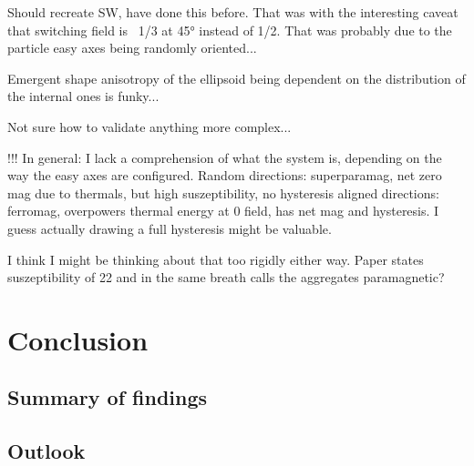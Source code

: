 \documentclass[12pt, DIV=12]{scrartcl}
\begin{document}
Should recreate SW, have done this before. That was with the interesting caveat that switching field is ~1/3 at 45° instead of 1/2. That was probably due to the particle easy axes being randomly oriented...

Emergent shape anisotropy of the ellipsoid being dependent on the distribution of the internal ones is funky...

Not sure how to validate anything more complex...

!!! In general: I lack a comprehension of what the system is, depending on the way the easy axes are configured.
Random directions: superparamag, net zero mag due to thermals, but high suszeptibility, no hysteresis
aligned directions: ferromag, overpowers thermal energy at 0 field, has net mag and hysteresis.
I guess actually drawing a full hysteresis might be valuable.

I think I might be thinking about that too rigidly either way.
Paper states suszeptibility of 22 and in the same breath calls the aggregates paramagnetic?

\section{Conclusion}
\subsection{Summary of findings}
\subsection{Outlook}

\newpage



\end{document}
